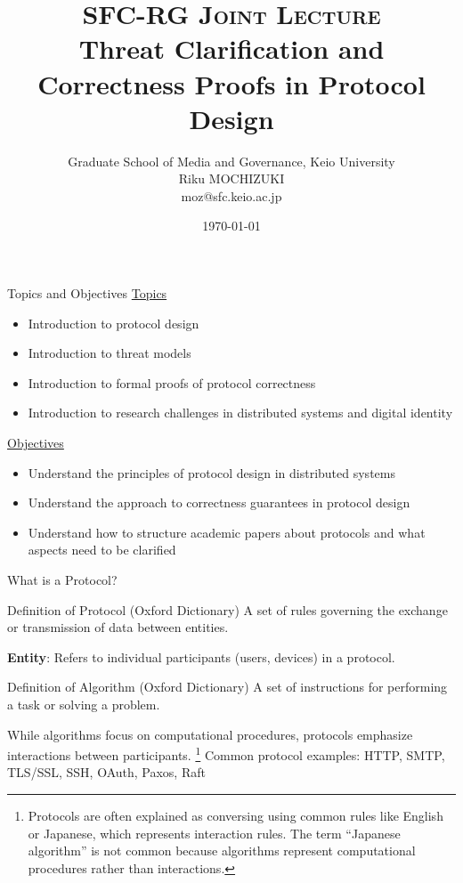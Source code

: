 \documentclass[aspectratio=169,10pt]{beamer}
\title{\textsc{SFC-RG Joint Lecture} \\ Threat Clarification and Correctness Proofs in Protocol Design}
\author{
    Graduate School of Media and Governance, Keio University\\
    \vspace{0.5em}
    Riku MOCHIZUKI\\
    moz@sfc.keio.ac.jp
}
\date{\today}
\newenvironment{proofblock}[1][]
{\begin{block}{#1}\vspace{0.5em}}
{\vspace{0.5em}\end{block}}
\begin{document}
\begin{frame}
\titlepage
\end{frame}


\begin{frame}{Topics and Objectives}
\underline{Topics}
\begin{itemize}
    \item Introduction to protocol design
    \item Introduction to threat models
    \item Introduction to formal proofs of protocol correctness
    \item Introduction to research challenges in distributed systems and digital identity
\end{itemize}

\underline{Objectives}
\begin{itemize}
    \item Understand the principles of protocol design in distributed systems
    \item Understand the approach to correctness guarantees in protocol design
    \item Understand how to structure academic papers about protocols and what aspects need to be clarified
\end{itemize}
\end{frame}

\begin{frame}{What is a Protocol?}
\begin{proofblock}[Definition of Protocol (Oxford Dictionary)]
A set of rules governing the exchange or transmission of data between entities.
\end{proofblock}

\textbf{Entity}: Refers to individual participants (users, devices) in a protocol.



\begin{proofblock}[Definition of Algorithm (Oxford Dictionary)]
A set of instructions for performing a task or solving a problem.
\end{proofblock}

While algorithms focus on computational procedures, protocols emphasize interactions between participants.
\footnote{Protocols are often explained as conversing using common rules like English or Japanese, which represents interaction rules.
The term ``Japanese algorithm'' is not common because algorithms represent computational procedures rather than interactions.}
Common protocol examples: HTTP, SMTP, TLS/SSL, SSH, OAuth, Paxos, Raft

\end{frame}
\end{document}
